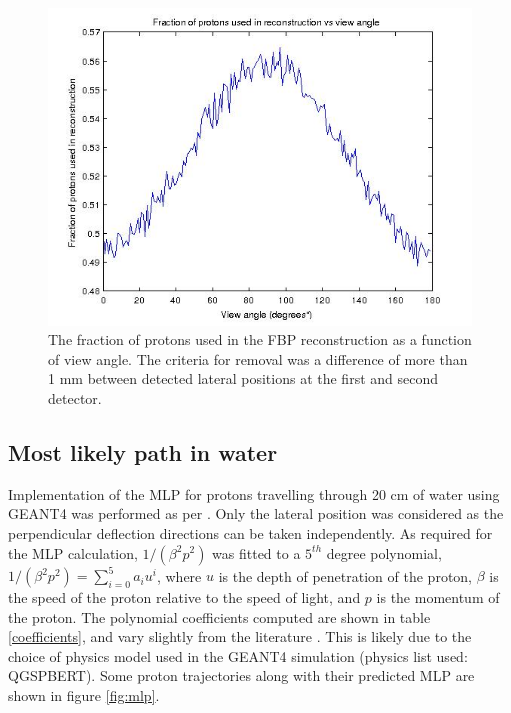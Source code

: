 \documentclass[11pt,a4paper]{article}
\begin{document}
\begin{figure}[!htpb]
\centering
\includegraphics[scale=0.5]{img/fbpFracFilt.jpg}
\caption{The fraction of protons used in the FBP reconstruction as a function of view angle. The criteria for removal was a difference of more than 1 mm between detected lateral positions at the first and second detector.}
\label{fig:fbpFracFilt}
\end{figure}

\FloatBarrier


\subsection{Most likely path in water}
Implementation of the MLP for protons travelling through 20 cm of water using GEANT4 was performed as per \cite{schulte2008maximum}. Only the lateral position was considered as the perpendicular deflection directions can be taken independently. As required for the MLP calculation, $1/(\beta^2 p^2)$ was fitted to a $5^{th}$ degree polynomial, $1/(\beta^2 p^2) = \sum_{i=0}^5 a_{i} u^i$, where $u$ is the depth of penetration of the proton, $\beta$ is the speed of the proton relative to the speed of light, and $p$ is the momentum of the proton. The polynomial coefficients computed are shown in table \ref{coefficients}, and vary slightly from the literature \cite{schulte2008maximum,williams2004most}. This is likely due to the choice of physics model used in the GEANT4 simulation (physics list used: QGSP\textunderscore BERT). Some proton trajectories along with their predicted MLP are shown in figure \ref{fig:mlp}. 
\end{document}
